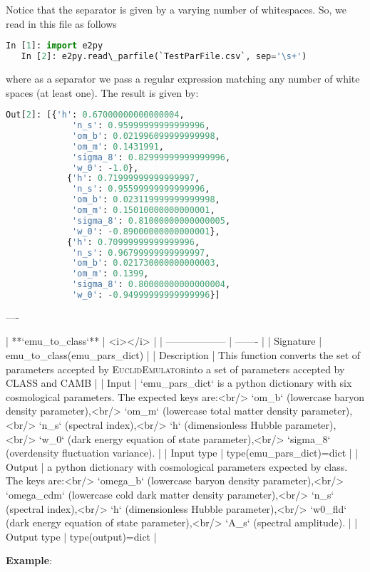 \documentclass[american,11pt]{article}
\begin{document}
Notice that the separator is given by a varying number of whitespaces. So, we read in this file as follows

\begin{lstlisting}[language=python]
   In [1]: import e2py
   In [2]: e2py.read\_parfile(`TestParFile.csv`, sep='\s+')
\end{lstlisting}
where as a separator we pass a regular expression matching any number of white spaces (at least one). The result is given by:

\begin{lstlisting}[language=python]
   Out[2]: [{'h': 0.67000000000000004,
             'n_s': 0.95999999999999996,
             'om_b': 0.021996099999999998,
             'om_m': 0.1431991,
             'sigma_8': 0.82999999999999996,
             'w_0': -1.0},
            {'h': 0.71999999999999997,
             'n_s': 0.95599999999999996,
             'om_b': 0.023119999999999998,
             'om_m': 0.15010000000000001,
             'sigma_8': 0.81000000000000005,
             'w_0': -0.89000000000000001},
            {'h': 0.70999999999999996,
             'n_s': 0.96799999999999997,
             'om_b': 0.021730000000000003,
             'om_m': 0.1399,
             'sigma_8': 0.80000000000000004,
             'w_0': -0.94999999999999996}]  
\end{lstlisting}
----

| **`emu\_to\_class`** | <i></i> |
| ------------------ | ------- |
| Signature | emu\_to\_class(emu\_pars\_dict) |
| Description | This function converts the set of parameters accepted by \textsc{EuclidEmulator}into a set of parameters accepted by CLASS and CAMB |
| Input | `emu\_pars\_dict` is a python dictionary with six cosmological parameters. The expected keys are:<br/> `om\_b` (lowercase baryon density parameter),<br/> `om\_m` (lowercase total matter density parameter),<br/> `n\_s` (spectral index),<br/> `h` (dimensionless Hubble parameter),<br/> `w\_0` (dark energy equation of state parameter),<br/> `sigma\_8` (overdensity fluctuation variance). |
| Input type | type(emu\_pars\_dict)=dict  |
| Output | a python dictionary with cosmological parameters expected by class. The keys are:<br/> `omega\_b` (lowercase baryon density parameter),<br/> `omega\_cdm` (lowercase cold dark matter density parameter),<br/> `n\_s` (spectral index),<br/> `h` (dimensionless Hubble parameter),<br/> `w0\_fld` (dark energy equation of state parameter),<br/> `A\_s` (spectral amplitude). |
| Output type | type(output)=dict  |

\textbf{Example}:
\end{document}
